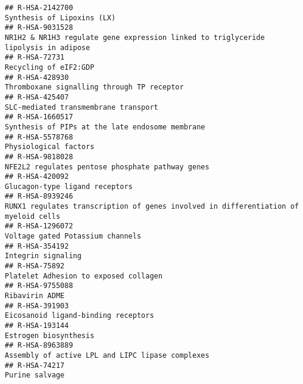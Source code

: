 \documentclass[
]{article}
\begin{document}
\begin{verbatim}
## R-HSA-2142700                                                                                                           Synthesis of Lipoxins (LX)
## R-HSA-9031528                                                   NR1H2 & NR1H3 regulate gene expression linked to triglyceride lipolysis in adipose
## R-HSA-72731                                                                                                                  Recycling of eIF2:GDP
## R-HSA-428930                                                                                            Thromboxane signalling through TP receptor
## R-HSA-425407                                                                                                  SLC-mediated transmembrane transport
## R-HSA-1660517                                                                                      Synthesis of PIPs at the late endosome membrane
## R-HSA-5578768                                                                                                                Physiological factors
## R-HSA-9818028                                                                                     NFE2L2 regulates pentose phosphate pathway genes
## R-HSA-420092                                                                                                        Glucagon-type ligand receptors
## R-HSA-8939246                                                  RUNX1 regulates transcription of genes involved in differentiation of myeloid cells
## R-HSA-1296072                                                                                                     Voltage gated Potassium channels
## R-HSA-354192                                                                                                                    Integrin signaling
## R-HSA-75892                                                                                                  Platelet Adhesion to exposed collagen
## R-HSA-9755088                                                                                                                       Ribavirin ADME
## R-HSA-391903                                                                                                   Eicosanoid ligand-binding receptors
## R-HSA-193144                                                                                                                 Estrogen biosynthesis
## R-HSA-8963889                                                                                     Assembly of active LPL and LIPC lipase complexes
## R-HSA-74217                                                                                                                         Purine salvage

\end{verbatim}
\end{document}
